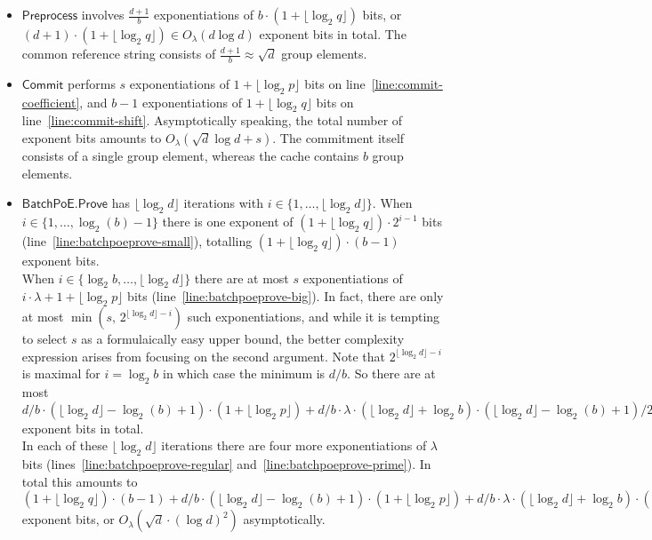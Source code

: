 \documentclass{article}
\theoremstyle{definition}
\begin{document}
\begin{itemize}
\item $\mathsf{Preprocess}$ involves $\frac{d+1}{b}$ exponentiations of $b \cdot (1 + \lfloor \log_2 q \rfloor)$ bits, or $(d+1) \cdot (1 + \lfloor \log_2 q \rfloor) \in O_\lambda(d \log d)$ exponent bits in total. The common reference string consists of $\frac{d+1}{b}\approx\sqrt{d}$ group elements.
\item $\mathsf{Commit}$ performs $s$ exponentiations of $1+\lfloor \log_2 p \rfloor$ bits on line~\ref{line:commit-coefficient}, and $b-1$ exponentiations of $1+\lfloor \log_2 q \rfloor$ bits on line~\ref{line:commit-shift}. Asymptotically speaking, the total number of exponent bits amounts to $O_\lambda(\sqrt{d} \log d + s)$. The commitment itself consists of a single group element, whereas the cache contains $b$ group elements.
\item $\mathsf{BatchPoE.Prove}$ has $\lfloor \log_2 d \rfloor$ iterations with $i \in \{1, \ldots, \lfloor \log_2 d \rfloor\}$. When $i \in \{1, \ldots, \log_2(b)-1\}$ there is one exponent of $(1 + \lfloor \log_2 q \rfloor) \cdot {2^{i-1}}$ bits (line~\ref{line:batchpoeprove-small}), totalling $(1+\lfloor \log_2 q \rfloor) \cdot (b-1)$ exponent bits. \\
When $i \in \{\log_2 b, \ldots, \lfloor \log_2 d \rfloor\}$ there are at most $s$ exponentiations of $i \cdot \lambda + 1 + \lfloor \log_2 p \rfloor$ bits (line~\ref{line:batchpoeprove-big}). In fact, there are only at most $\min(s, \, 2^{\lfloor \log_2 d \rfloor - i})$ such exponentiations, and while it is tempting to select $s$ as a formulaically easy upper bound, the better complexity expression arises from focusing on the second argument. Note that $2^{\lfloor \log_2 d \rfloor - i}$ is maximal for $i = \log_2 b$ in which case the minimum is $d/b$. So there are at most $d/b \cdot (\lfloor \log_2 d \rfloor - \log_2(b) + 1) \cdot (1 + \lfloor \log_2 p \rfloor) + d/b \cdot \lambda \cdot (\lfloor \log_2 d \rfloor + \log_2 b) \cdot (\lfloor \log_2 d \rfloor - \log_2(b) + 1)/2$ exponent bits in total. \\
In each of these $\lfloor \log_2 d \rfloor$ iterations there are four more exponentiations of $\lambda$ bits (lines~\ref{line:batchpoeprove-regular} and~\ref{line:batchpoeprove-prime}). In total this amounts to $(1+\lfloor \log_2 q \rfloor) \cdot (b-1)  +  d/b \cdot (\lfloor \log_2 d \rfloor - \log_2(b) + 1) \cdot (1 + \lfloor \log_2 p \rfloor) + d/b \cdot \lambda \cdot (\lfloor \log_2 d \rfloor + \log_2 b) \cdot (\lfloor \log_2 d \rfloor - \log_2(b) + 1)/2  +  4 \cdot \lambda \cdot \lfloor \log_2 d \rfloor$ exponent bits, or $O_\lambda(\sqrt{d} \cdot (\log d)^2)$ asymptotically.

\end{itemize}
\end{document}
